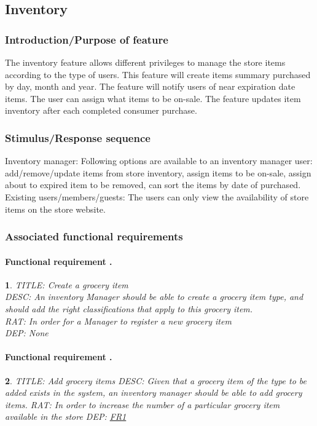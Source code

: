 \documentclass{scrreprt}
\theoremstyle{funreq}
\newtheorem{funreq}{}
\newcommand*{\reqref}[1]{\hyperref[#1]{FR\ref*{#1}}}
\begin{document}
\subsection{Inventory}
\subsubsection{Introduction/Purpose of feature}
The inventory feature allows different privileges to manage the store items according to the type of users. This feature will create items summary purchased by day, month and year. The feature will notify users of near expiration date items. The user can assign what items to be on-sale. The feature updates item inventory after each completed consumer purchase.

\subsubsection{Stimulus/Response sequence}
Inventory manager:
Following options are available to an inventory manager user: add/remove/update items from store inventory, assign items to be on-sale, assign about to expired item to be removed, can sort the items by date of purchased.
Existing users/members/guests:
The users can only view the availability of store items on the store website.

\subsubsection{Associated functional requirements}
\paragraph[]{Functional requirement .}
	\begin{funreq}
		
		\label{inventory_create}
		TITLE: Create a grocery item\\
		DESC: An inventory Manager should be able to create a grocery item type, and should add the right classifications that apply to this grocery item. \\
		RAT: In order for a Manager to register a new grocery item\\
		DEP: None\\
	\end{funreq}

\paragraph[]{Functional requirement .}
\begin{funreq}
	
	\label{inventory_additems}
	TITLE: Add grocery items
	DESC: Given that a grocery item of the type to be added exists in the system, an inventory manager should be able to add grocery items.
	RAT: In order to increase the number of a particular grocery item available in the store
	DEP: \reqref{inventory_create}
\end{funreq}
\end{document}
